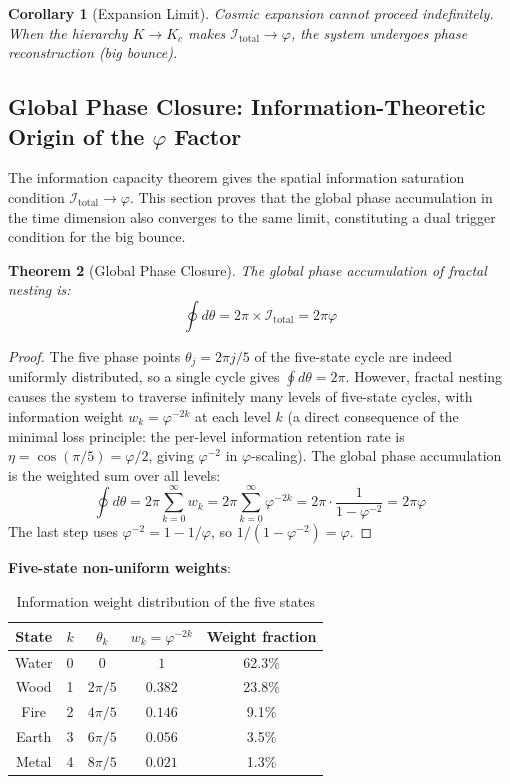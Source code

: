 \documentclass[12pt,a4paper,twocolumn]{article}
\renewcommand{\phi}{\varphi}
\newtheorem{theorem}{Theorem}[section]
\newtheorem{corollary}[theorem]{Corollary}
\begin{document}
\begin{corollary}[Expansion Limit]
Cosmic expansion cannot proceed indefinitely. When the hierarchy $K \to K_c$ makes $\mathcal{I}_{\text{total}} \to \phi$, the system undergoes phase reconstruction (big bounce).
\end{corollary}

\subsection{Global Phase Closure: Information-Theoretic Origin of the $\phi$ Factor}
\label{subsec:phase_closure}

The information capacity theorem gives the spatial information saturation condition $\mathcal{I}_{\text{total}} \to \phi$. This section proves that the global phase accumulation in the time dimension also converges to the same limit, constituting a dual trigger condition for the big bounce.

\begin{theorem}[Global Phase Closure]
\label{thm:phase_closure}
The global phase accumulation of fractal nesting is:
\begin{equation}
\oint d\theta = 2\pi \times \mathcal{I}_{\text{total}} = 2\pi\phi
\end{equation}
\end{theorem}

\begin{proof}
The five phase points $\theta_j = 2\pi j/5$ of the five-state cycle are indeed uniformly distributed, so a single cycle gives $\oint d\theta = 2\pi$. However, fractal nesting causes the system to traverse infinitely many levels of five-state cycles, with information weight $w_k = \phi^{-2k}$ at each level $k$ (a direct consequence of the minimal loss principle: the per-level information retention rate is $\eta = \cos(\pi/5) = \phi/2$, giving $\phi^{-2}$ in $\phi$-scaling). The global phase accumulation is the weighted sum over all levels:
\[
\oint d\theta = 2\pi \sum_{k=0}^{\infty} w_k = 2\pi \sum_{k=0}^{\infty} \phi^{-2k} = 2\pi \cdot \frac{1}{1-\phi^{-2}} = 2\pi\phi
\]
The last step uses $\phi^{-2} = 1 - 1/\phi$, so $1/(1-\phi^{-2}) = \phi$.
\end{proof}

\textbf{Five-state non-uniform weights}:

\begin{table}[H]
\centering
\caption{Information weight distribution of the five states}
\label{tab:five_state_weights}
\begin{tabular}{c|c|c|c|c}
\hline
State & $k$ & $\theta_k$ & $w_k = \phi^{-2k}$ & Weight fraction \\
\hline
Water & 0 & $0$ & $1$ & 62.3\% \\
Wood & 1 & $2\pi/5$ & $0.382$ & 23.8\% \\
Fire & 2 & $4\pi/5$ & $0.146$ & 9.1\% \\
Earth & 3 & $6\pi/5$ & $0.056$ & 3.5\% \\
Metal & 4 & $8\pi/5$ & $0.021$ & 1.3\% \\
\hline
\end{tabular}
\end{table}
\end{document}
